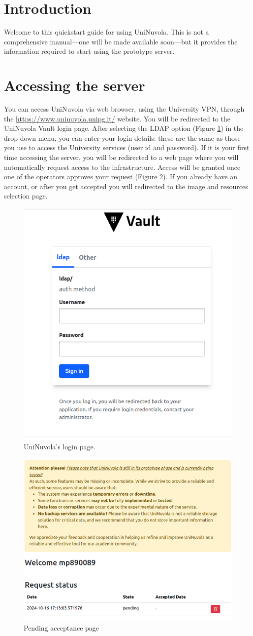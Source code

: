 \section{Introduction}

Welcome to this quickstart guide for using UniNuvola. This is not a comprehensive manual—one will be made available
soon—but it provides the information required to start using the prototype server.

\section{Accessing the server}

You can access UniNuvola via web browser, using the University VPN, through the
\href{https://www.uninuvola.unipg.it/}{https://www.uninuvola.unipg.it/} website. You will be redirected to the UniNuvola
Vault login page. After selecting the LDAP option (Figure \ref{fig:login}) in the drop-down menu, you can enter your
login details: these are the same as those you use to access the University services (user id and password). If it is
your first time accessing the server, you will be redirected to a web page  where you will automatically request access
to the infrastructure. Access will be granted once one of the operators approves your request (Figure
\ref{fig:pending}). If you already have an account, or after you get accepted you will redirected to the image and
resources selection page.


\begin{figure}[!ht]
    \centering
    \includegraphics[width=0.5\linewidth]{img/login_page.png}
    \caption{UniNuvola's login page.}
    \label{fig:login}
\end{figure}



\begin{figure}[!ht]
    \centering
    \includegraphics[width=0.5\linewidth]{img/request_page.png}
    \caption{Pending acceptance page}
    \label{fig:pending}
\end{figure}

